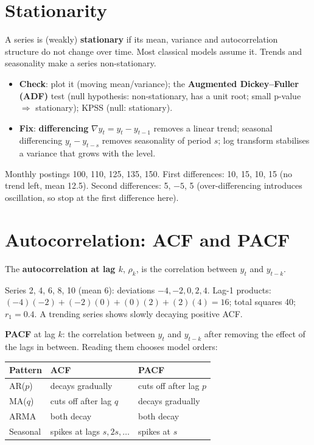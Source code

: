 \section{Stationarity}
A series is (weakly) \textbf{stationary} if its mean, variance and autocorrelation structure do not change over time. Most classical models assume it. Trends and
seasonality make a series non-stationary.
\begin{itemize}
\item \textbf{Check}: plot it (moving mean/variance); the \textbf{Augmented Dickey--Fuller (ADF)} test (null hypothesis: non-stationary, has a unit root; small p-value $\Rightarrow$
  stationary); KPSS (null: stationary).
\item \textbf{Fix}: \textbf{differencing} $\nabla y_t = y_t - y_{t-1}$ removes a linear trend; seasonal differencing $y_t - y_{t-s}$ removes seasonality of period $s$; log
  transform stabilises a variance that grows with the level.
\end{itemize}
\begin{example}[: differencing]
Monthly postings 100, 110, 125, 135, 150. First differences: 10, 15, 10, 15 (no trend left, mean 12.5). Second differences: 5, $-5$, 5 (over-differencing introduces
oscillation, so stop at the first difference here).
\end{example}

\section{Autocorrelation: ACF and PACF}
The \textbf{autocorrelation at lag $k$}, $\rho_k$, is the correlation between $y_t$ and $y_{t-k}$.
\begin{example}
Series 2, 4, 6, 8, 10 (mean 6): deviations $-4,-2,0,2,4$. Lag-1 products: $(-4)(-2) + (-2)(0) + (0)(2) + (2)(4) = 16$; total squares 40; $r_1 = 0.4$.
A trending series shows slowly decaying positive ACF.
\end{example}
\textbf{PACF} at lag $k$: the correlation between $y_t$ and $y_{t-k}$ after removing the effect of the lags in between. Reading them chooses model orders:
\begin{center}\small
\begin{tabular}{lll}
\toprule
Pattern & ACF & PACF\\
\midrule
AR($p$) & decays gradually & cuts off after lag $p$\\
MA($q$) & cuts off after lag $q$ & decays gradually\\
ARMA & both decay & both decay\\
Seasonal & spikes at lags $s, 2s, \dots$ & spikes at $s$\\
\bottomrule
\end{tabular}
\end{center}


